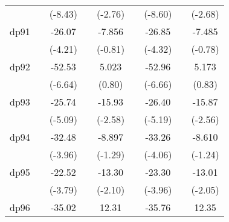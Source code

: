 {\begin{tabular}{l*{8}{c}}
            &                     &     (-8.43)         &                     &     (-2.76)         &                     &     (-8.60)         &                     &     (-2.68)         \\
[1em]
dp91        &                     &      -26.07\sym{***}&                     &      -7.856         &                     &      -26.85\sym{***}&                     &      -7.485         \\
            &                     &     (-4.21)         &                     &     (-0.81)         &                     &     (-4.32)         &                     &     (-0.78)         \\
[1em]
dp92        &                     &      -52.53\sym{***}&                     &       5.023         &                     &      -52.96\sym{***}&                     &       5.173         \\
            &                     &     (-6.64)         &                     &      (0.80)         &                     &     (-6.66)         &                     &      (0.83)         \\
[1em]
dp93        &                     &      -25.74\sym{***}&                     &      -15.93\sym{**} &                     &      -26.40\sym{***}&                     &      -15.87\sym{*}  \\
            &                     &     (-5.09)         &                     &     (-2.58)         &                     &     (-5.19)         &                     &     (-2.56)         \\
[1em]
dp94        &                     &      -32.48\sym{***}&                     &      -8.897         &                     &      -33.26\sym{***}&                     &      -8.610         \\
            &                     &     (-3.96)         &                     &     (-1.29)         &                     &     (-4.06)         &                     &     (-1.24)         \\
[1em]
dp95        &                     &      -22.52\sym{***}&                     &      -13.30\sym{*}  &                     &      -23.30\sym{***}&                     &      -13.01\sym{*}  \\
            &                     &     (-3.79)         &                     &     (-2.10)         &                     &     (-3.96)         &                     &     (-2.05)         \\
[1em]
dp96        &                     &      -35.02\sym{***}&                     &       12.31         &                     &      -35.76\sym{***}&                     &       12.35         \\

\end{tabular}}
